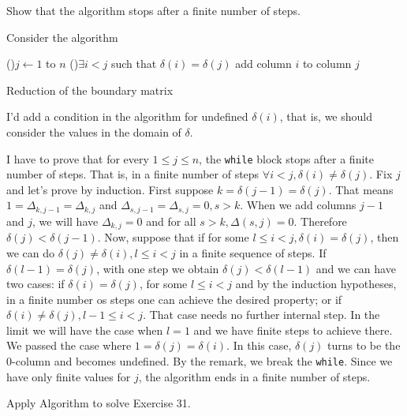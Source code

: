 \noindent\linia

\begin{exercise}
    Show that the algorithm stops after a finite number of steps.
\end{exercise}

Consider the algorithm

\begin{algorithm}[H]
    \SetAlgoLined
     \For(){$j \leftarrow 1$ to $n$}{
        \While(){$\exists i < j$ such that $\delta(i) = \delta(j)$}{
            add column $i$ to column $j$
        }
     }
     \caption{Reduction of the boundary matrix}
    \end{algorithm}

\begin{remark}
    I'd add a condition in the algorithm for undefined $\delta(i)$, that is,
    we should consider the values in the domain of $\delta$.
\end{remark}

I have to prove that for every $1 \le j \le n$, the \texttt{while} block stops
after a finite number of steps. That is, in a finite number of steps $\forall
i < j, \delta(i) \neq \delta(j)$. Fix $j$ and let's prove by induction. First
suppose $k = \delta(j-1) = \delta(j)$. That means $1 = \Delta_{k,j-1} =
\Delta_{k,j}$ and $\Delta_{s,j-1} = \Delta_{s,j}=0, s > k$. When we add
columns $j-1$ and $j$, we will have $\Delta_{k,j} = 0$ and for all $s > k,
\Delta(s, j) = 0$. Therefore $\delta(j) < \delta(j-1)$. Now, suppose that if for
some $l \le i < j, \delta(i) = \delta(j)$,  then we can
do $\delta(j) \neq \delta(i), l \le i < j$ in a finite sequence of steps. If $\delta(l-1) = \delta(j)$, with one step we obtain $\delta(j) <
\delta(l-1)$ and we can have two cases: if $\delta(i) = \delta(j)$, for some
$l \le i < j$ and by the
induction hypotheses, in a finite number os steps one can achieve the desired
property; or if $\delta(i) \neq \delta(j), l-1 \le i < j$. That case needs no
further internal step. In the limit we will have the case when $l=1$ and we
have finite steps to achieve there. We passed the case where $1 = \delta(j) =
\delta(i)$. In this case, $\delta(j)$ turns to be the 0-column and becomes
undefined. By the remark, we break the \texttt{while}. Since we have only
finite values for $j$, the algorithm ends in a finite number of steps. 

\noindent\linia 

\begin{exercise}
    Apply Algorithm to solve Exercise 31.
\end{exercise}

